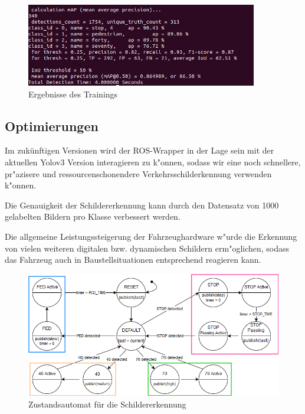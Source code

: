 \begin{figure}[ht]
	\centering
	\includegraphics[width=0.9\textwidth]{images/ergebnis}
	\caption{Ergebnisse des Trainings}
	\label{fig:ergebnis}
\end{figure}

\subsection{Optimierungen}
Im zuk\"unftigen Versionen wird der ROS-Wrapper in der Lage sein mit der aktuellen Yolov3 Version interagieren zu k"onnen, sodass wir eine noch schnellere, pr"azisere und ressourcenschonendere Verkehrsschilderkennung verwenden k"onnen.

Die Genauigkeit der Schildererkennung kann durch den Datensatz von 1000 gelabelten Bildern pro Klasse verbessert werden.

Die allgemeine Leistungssteigerung der Fahrzeughardware w"urde die Erkennung von vielen weiteren digitalen bzw. dynamischen Schildern erm"oglichen, sodass das Fahrzeug auch in Baustellsituationen entsprechend reagieren kann.

\begin{figure}[ht]
	\centering
	\includegraphics[width = 1\textwidth]{images/StateMachine.png}
	\caption{Zustandsautomat f\"ur die Schildererkennung}
	\label{fig:zustandsautomat}
\end{figure}

